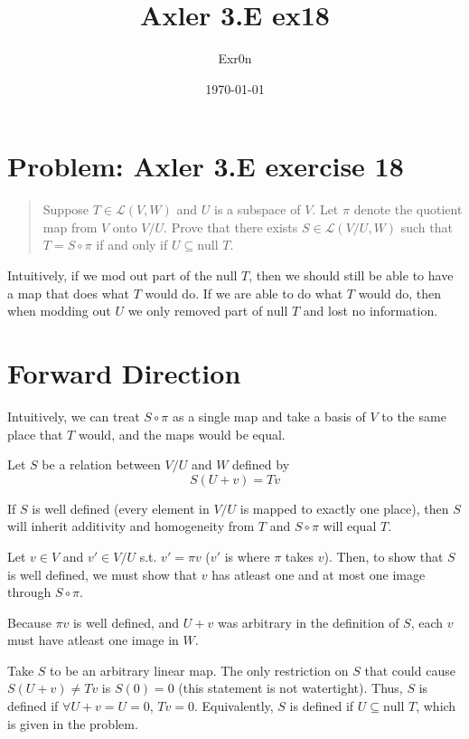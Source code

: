 \documentclass[letterpaper]{article}
\author{Exr0n}
\date{\today}
\title{Axler 3.E ex18}
\renewcommand\maketitle{}
\begin{document}
\maketitle
\section{Problem: Axler 3.E exercise 18}
\label{sec:org9049d1e}
\begin{quote}
Suppose \(T \in \mathcal L(V, W)\) and \(U\) is a subspace of \(V\). Let \(\pi\) denote the quotient map from \(V\) onto \(V/U\). Prove that there exists \(S \in \mathcal L(V/U, W)\) such that \(T = S \circ \pi\) if and only if \(U \subseteq \text{null }T\).
\end{quote}
Intuitively, if we mod out part of the \(\text{null }T\), then we should still be able to have a map that does what \(T\) would do. If we are able to do what \(T\) would do, then when modding out \(U\) we only removed part of \(\text{null }T\) and lost no information.

\section{Forward Direction}
\label{sec:org3ac2635}

Intuitively, we can treat \(S \circ \pi\) as a single map and take a basis of \(V\) to the same place that \(T\) would, and the maps would be equal.

Let \(S\) be a relation between \(V/U\) and \(W\) defined by
\[ S(U+v) = Tv \]

If \(S\) is well defined (every element in \(V/U\) is mapped to exactly one place), then \(S\) will inherit additivity and homogeneity from \(T\) and \(S \circ \pi\) will equal \(T\).

Let \(v \in V\) and \(v' \in V/U\) s.t. \(v' = \pi v\) (\(v'\) is where \(\pi\) takes \(v\)). Then, to show that \(S\) is well defined, we must show that \(v\) has atleast one and at most one image through \(S \circ \pi\).

Because \(\pi v\) is well defined, and \(U+v\) was arbitrary in the definition of \(S\), each \(v\) must have atleast one image in \(W\).

Take \(S\) to be an arbitrary linear map. The only restriction on \(S\) that could cause \(S(U+v) \neq Tv\) is \(S(0) = 0\) (this statement is not watertight).
Thus, \(S\) is defined if \(\forall U+v = U = 0\), \(Tv = 0\). Equivalently, \(S\) is defined if \(U \subseteq \text{null }T\), which is given in the problem.
\end{document}
